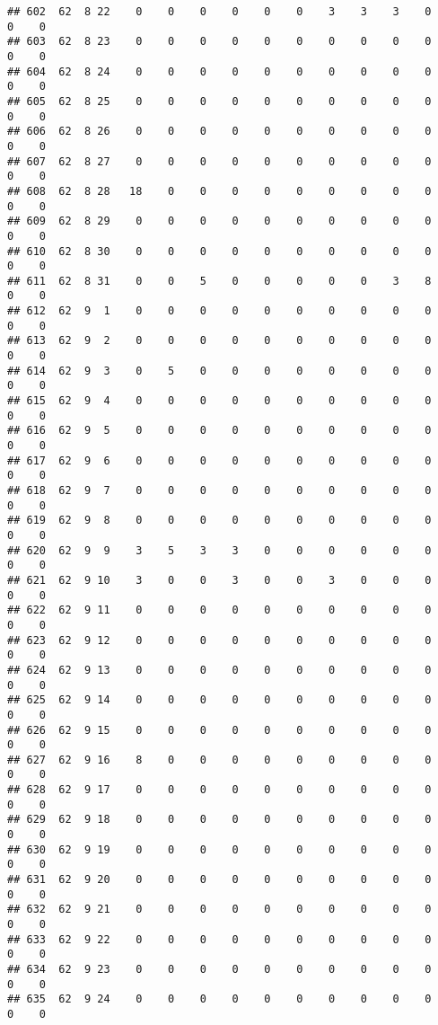 \documentclass[]{article}
\begin{document}
\begin{verbatim}
## 602  62  8 22    0    0    0    0    0    0    3    3    3    0    0    0
## 603  62  8 23    0    0    0    0    0    0    0    0    0    0    0    0
## 604  62  8 24    0    0    0    0    0    0    0    0    0    0    0    0
## 605  62  8 25    0    0    0    0    0    0    0    0    0    0    0    0
## 606  62  8 26    0    0    0    0    0    0    0    0    0    0    0    0
## 607  62  8 27    0    0    0    0    0    0    0    0    0    0    0    0
## 608  62  8 28   18    0    0    0    0    0    0    0    0    0    0    0
## 609  62  8 29    0    0    0    0    0    0    0    0    0    0    0    0
## 610  62  8 30    0    0    0    0    0    0    0    0    0    0    0    0
## 611  62  8 31    0    0    5    0    0    0    0    0    3    8    0    0
## 612  62  9  1    0    0    0    0    0    0    0    0    0    0    0    0
## 613  62  9  2    0    0    0    0    0    0    0    0    0    0    0    0
## 614  62  9  3    0    5    0    0    0    0    0    0    0    0    0    0
## 615  62  9  4    0    0    0    0    0    0    0    0    0    0    0    0
## 616  62  9  5    0    0    0    0    0    0    0    0    0    0    0    0
## 617  62  9  6    0    0    0    0    0    0    0    0    0    0    0    0
## 618  62  9  7    0    0    0    0    0    0    0    0    0    0    0    0
## 619  62  9  8    0    0    0    0    0    0    0    0    0    0    0    0
## 620  62  9  9    3    5    3    3    0    0    0    0    0    0    0    0
## 621  62  9 10    3    0    0    3    0    0    3    0    0    0    0    0
## 622  62  9 11    0    0    0    0    0    0    0    0    0    0    0    0
## 623  62  9 12    0    0    0    0    0    0    0    0    0    0    0    0
## 624  62  9 13    0    0    0    0    0    0    0    0    0    0    0    0
## 625  62  9 14    0    0    0    0    0    0    0    0    0    0    0    0
## 626  62  9 15    0    0    0    0    0    0    0    0    0    0    0    0
## 627  62  9 16    8    0    0    0    0    0    0    0    0    0    0    0
## 628  62  9 17    0    0    0    0    0    0    0    0    0    0    0    0
## 629  62  9 18    0    0    0    0    0    0    0    0    0    0    0    0
## 630  62  9 19    0    0    0    0    0    0    0    0    0    0    0    0
## 631  62  9 20    0    0    0    0    0    0    0    0    0    0    0    0
## 632  62  9 21    0    0    0    0    0    0    0    0    0    0    0    0
## 633  62  9 22    0    0    0    0    0    0    0    0    0    0    0    0
## 634  62  9 23    0    0    0    0    0    0    0    0    0    0    0    0
## 635  62  9 24    0    0    0    0    0    0    0    0    0    0    0    0

\end{verbatim}
\end{document}
